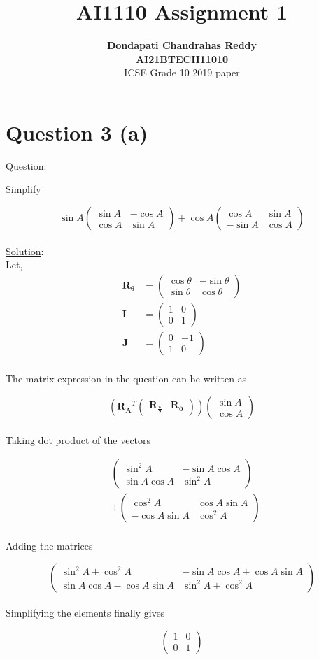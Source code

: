 \documentclass[journal,12pt,twocolumn]{IEEEtran}
\newcommand{\myvec}[1]{\ensuremath{\begin{pmatrix}#1\end{pmatrix}}}
\let\vec\mathbf
\begin{document}
\title{\textbf{AI1110 Assignment 1} }
\author{\textbf{Dondapati Chandrahas Reddy}\\ \textbf{AI21BTECH11010}\\ ICSE Grade 10 2019 paper}

\maketitle

{\section {Question 3 (a) \newline}}

{\large \underline{Question}:\newline}

Simplify

\begin{equation}
	\sin A\myvec{\sin A &  -\cos A \\ \cos A & \sin A} + \cos A \myvec{\cos A &  \sin A \\ -\sin A & \cos A}
\end{equation}\\

{\large \underline{Solution}:}\\

Let,
\begin{align}
	\vec{R_\theta} &= \myvec{\cos \theta &  -\sin \theta \\ \sin \theta & \cos \theta} \\[1em] \vec{I} &= \myvec{1 & 0 \\ 0 & 1} \\[1em] \vec{J} &= \myvec{0 & -1 \\ 1 & 0}
\end{align}\\

The matrix expression in the question can be written as

\begin{equation}
	\left(\vec{R_A}^T \myvec{\vec{R_{\frac{\pi}{2}}} & \vec{R_0}}\right) \myvec{\sin A \\ \cos A}
\end{equation}\\

Taking dot product of the vectors

\begin{align}
	& \myvec{\sin^2 A &  -\sin A\cos A \\ \sin A\cos A & \sin^2 A} \nonumber \\ 
	& + \myvec{\cos^2 A & \cos A\sin A \\ -\cos A\sin A & \cos^2 A}
\end{align}\\

Adding the matrices

\begin{equation}
	\myvec{\sin^2 A + \cos^2 A &  -\sin A \cos A +\cos A \sin A \\ \sin A \cos A -\cos A \sin A & \sin^2 A + \cos^2 A}
\end{equation}\\

Simplifying the elements finally gives

\begin{equation}
	\myvec{1 & 0 \\ 0 & 1}
\end{equation}\\
\end{document}
